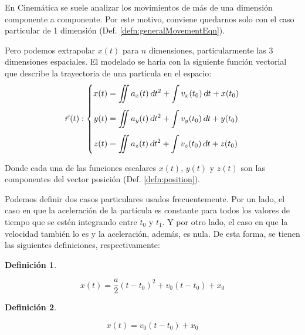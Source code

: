 \documentclass[a5paper,12pt,twoside]{book}
\newtheorem{defn}{{Definición}}[chapter]
\begin{document}
En Cinemática se suele analizar los movimientos de más de una dimensión componente a componente. Por este motivo, conviene quedarnos solo con el caso particular de 1 dimensión (Def. \ref{defn:generalMovementEqn}).

Pero podemos extrapolar $x(t)$ para $n$ dimensiones, particularmente las 3 dimensiones espaciales. El modelado se haría con la siguiente función vectorial que describe la trayectoria de una partícula en el espacio:
\[
  \vec{r}\hspace{0.05cm}(t) :
  \left\{
    \begin{aligned}
      x(t) &= \displaystyle\iint a_x(t) \, \textsl{d} t^2 + \displaystyle\int v_x(t_0) \, \textsl{d} t + x(t_0)
      \\[1ex]
      y(t) &= \displaystyle\iint a_y(t) \, \textsl{d} t^2 + \displaystyle\int v_y(t_0) \, \textsl{d} t + y(t_0)
      \\[1ex]
      z(t) &= \displaystyle\iint a_z(t) \, \textsl{d} t^2 + \displaystyle\int v_z(t_0) \, \textsl{d} t + z(t_0)
    \end{aligned}
  \right.
\]

Donde cada una de las funciones escalares $x(t)$, $y(t)$ y $z(t)$ son las componentes del vector posición (Def. \ref{defn:position}).

Podemos definir dos casos particulares usados frecuentemente.
Por un lado, el caso en que la aceleración de la partícula es constante para todos los valores de tiempo que se estén integrando entre $t_0$ y $t_1$. Y por otro lado, el caso en que la velocidad también lo es y la aceleración, además, es nula. De esta forma, se tienen las siguientes definiciones, respectivamente:

\begin{mdframed}[style=MyFrame1]
    \begin{defn}
        \label{defn:cstAccelMovementEqn}
    \end{defn}
    \begin{equation*}
        x(t) = \dfrac{a}{2}(t-t_0)^2 + v_0(t-t_0) + x_0
    \end{equation*}
\end{mdframed}

\begin{mdframed}[style=MyFrame1]
    \begin{defn}
        \label{defn:cstVelMovementEqn}
    \end{defn}
    \begin{equation*}
        x(t) = v_0(t-t_0) + x_0
    \end{equation*}
\end{mdframed}
\end{document}
